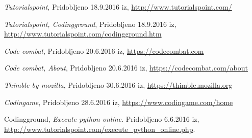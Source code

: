 \begin{thebibliography}{9}
 \emph{Tutorialspoint}, Pridobljeno 18.9.2016 iz,
  \url{http://www.tutorialspoint.com/}

 \emph{Tutorialspoint,
    Codingground}, Pridobljeno 18.9.2016 iz,
  \url{http://www.tutorialspoint.com/codingground.htm}

 \emph{Code combat}, Pridobljeno 20.6.2016 iz,
  \url{https://codecombat.com}

 \emph{Code combat, About}, Pridobljeno
  20.6.2016 iz, \url{https://codecombat.com/about}

 \emph{Thimble by mozilla}, Pridobljeno
  30.6.2016 iz, \url{https://thimble.mozilla.org}


 \emph{Codingame}, Pridobljeno 28.6.2016 iz,
  \url{https://www.codingame.com/home}









 Codingground, \emph{Execute python
    online}. Pridobljeno 6.6.2016 iz,
  \url{http://www.tutorialspoint.com/execute_python_online.php}.










\end{thebibliography}
